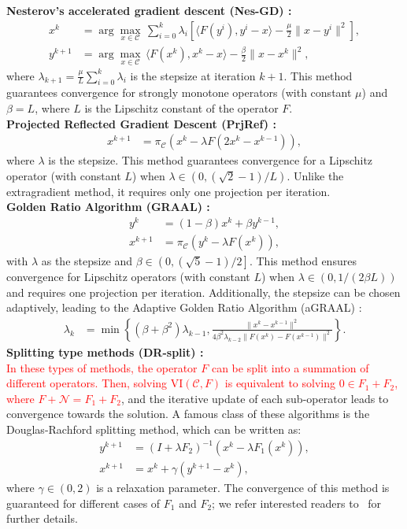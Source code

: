 \documentclass[letterpaper, 10 pt, conference]{ieeeconf}  %
\newcommand{\red}[1]{\textcolor{red}{#1}}
\begin{document}
\textbf{Nesterov's accelerated gradient descent (Nes-GD) \cite{nesterov2006solving}:}
\begin{align*}
    x^k &= \arg\max_{x \in \mathcal{C}} \, \sum_{i=0}^k \lambda_i \left[\langle F(y^i), y^i - x \rangle - \frac{\mu}{2} \|x - y^i\|^2\right], \\
    y^{k+1} &= \arg\max_{x \in \mathcal{C}} \, \langle F(x^k), x^k - x \rangle - \frac{\beta}{2} \|x - x^k\|^2,
\end{align*}
where \(\lambda_{k+1} = \frac{\mu}{L} \sum_{i=0}^k \lambda_i\) is the stepsize at iteration \(k+1\). This method guarantees convergence for strongly monotone operators (with constant \(\mu\)) and \(\beta = L\), where \(L\) is the Lipschitz constant of the operator \(F\).\\
\textbf{Projected Reflected Gradient Descent (PrjRef) \cite{malitsky2015projected}:}  
\begin{align*}
    x^{k+1} &= \pi_{\mathcal{C}}(x^k - \lambda F(2x^k - x^{k-1})),
\end{align*}
where \(\lambda\) is the stepsize. This method guarantees convergence for a Lipschitz operator (with constant \(L\)) when \(\lambda \in (0, (\sqrt{2}-1)/L)\). Unlike the extragradient method, it requires only one projection per iteration.\\
\textbf{Golden Ratio Algorithm (GRAAL) \cite{malitsky2020golden}:}  
\begin{align*}
    y^k &= (1-\beta)x^k + \beta y^{k-1}, \\
    x^{k+1} &= \pi_{\mathcal{C}}(y^k - \lambda F(x^k)),
\end{align*}
with \(\lambda\) as the stepsize and \(\beta \in \left(0, (\sqrt{5}-1)/2\right]\). This method ensures convergence for Lipschitz operators (with constant \(L\)) when \(\lambda \in (0, 1/(2\beta L))\) and requires one projection per iteration. Additionally, the stepsize can be chosen adaptively, leading to the Adaptive Golden Ratio Algorithm (aGRAAL) \cite{malitsky2020golden}: 
\begin{align*}
    \lambda_k &= \min\left\{(\beta + \beta^2)\lambda_{k-1}, \frac{\|x^k - x^{k-1}\|^2}{4\beta^2\lambda_{k-2}\|F(x^k) - F(x^{k-1})\|^2}\right\}.
\end{align*}
\textbf{Splitting type methods (DR-split) \cite{facchinei2003finite}:}\\
\red{In these types of methods, the operator \( F \) can be split into a summation of different operators. Then, solving \(\mathrm{VI}(\mathcal{C}, F)\) is equivalent to solving \(0 \in F_1 + F_2\), where \(F + \mathcal{N} = F_1 + F_2\)}, and the iterative update of each sub-operator leads to convergence towards the solution. A famous class of these algorithms is the Douglas-Rachford splitting method, which can be written as:
\begin{align*}
   y^{k+1} &= (I + \lambda F_2)^{-1}\left(x^k - \lambda F_1(x^k)\right), \\
   x^{k+1} &= x^k + \gamma(y^{k+1} - x^k),
\end{align*}
where $\gamma \in (0,2)$ is a relaxation parameter. The convergence of this method is guaranteed for different cases of $F_1$ and $F_2$; we refer interested readers to~\cite{giselsson2017tight,moursi1805douglas} for further details.
\end{document}
